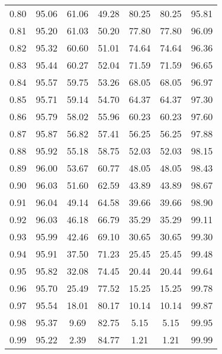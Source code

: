 \begin{tabular}{|c|c|c|c|c|c|c|}
      0.80 &     95.06 &     61.06 &      49.28 &   80.25 &      80.25 &         95.81 \\
      0.81 &     95.20 &     61.03 &      50.20 &   77.80 &      77.80 &         96.09 \\
      0.82 &     95.32 &     60.60 &      51.01 &   74.64 &      74.64 &         96.36 \\
      0.83 &     95.44 &     60.27 &      52.04 &   71.59 &      71.59 &         96.65 \\
      0.84 &     95.57 &     59.75 &      53.26 &   68.05 &      68.05 &         96.97 \\
      0.85 &     95.71 &     59.14 &      54.70 &   64.37 &      64.37 &         97.30 \\
      0.86 &     95.79 &     58.02 &      55.96 &   60.23 &      60.23 &         97.60 \\
      0.87 &     95.87 &     56.82 &      57.41 &   56.25 &      56.25 &         97.88 \\
      0.88 &     95.92 &     55.18 &      58.75 &   52.03 &      52.03 &         98.15 \\
      0.89 &     96.00 &     53.67 &      60.77 &   48.05 &      48.05 &         98.43 \\
      0.90 &     96.03 &     51.60 &      62.59 &   43.89 &      43.89 &         98.67 \\
      0.91 &     96.04 &     49.14 &      64.58 &   39.66 &      39.66 &         98.90 \\
      0.92 &     96.03 &     46.18 &      66.79 &   35.29 &      35.29 &         99.11 \\
      0.93 &     95.99 &     42.46 &      69.10 &   30.65 &      30.65 &         99.30 \\
      0.94 &     95.91 &     37.50 &      71.23 &   25.45 &      25.45 &         99.48 \\
      0.95 &     95.82 &     32.08 &      74.45 &   20.44 &      20.44 &         99.64 \\
      0.96 &     95.70 &     25.49 &      77.52 &   15.25 &      15.25 &         99.78 \\
      0.97 &     95.54 &     18.01 &      80.17 &   10.14 &      10.14 &         99.87 \\
      0.98 &     95.37 &      9.69 &      82.75 &    5.15 &       5.15 &         99.95 \\
      0.99 &     95.22 &      2.39 &      84.77 &    1.21 &       1.21 &         99.99 \\
\bottomrule
\end{tabular}
